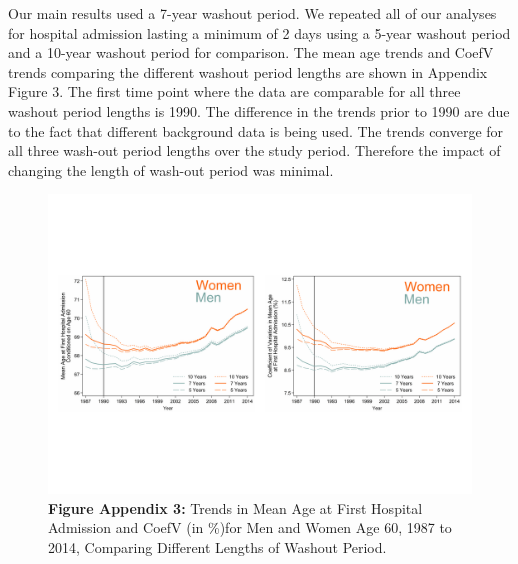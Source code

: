 \label{ch4:app3}

Our main results used a 7-year washout period. We repeated all of our analyses 
for hospital admission lasting a minimum of 2 days using a 5-year washout period 
and a 10-year washout period for comparison. The mean age trends and CoefV trends 
comparing the different washout period lengths are shown in Appendix Figure 3. The first 
time point where the data are comparable for all three washout period lengths is 
1990. The  difference in the trends prior to 1990 are due to the fact that different 
background data is being used. The trends converge for all three wash-out period 
lengths over the study period. Therefore the impact of changing the length of 
wash-out period was minimal. \\

\begin{landscape}


	\begin{figure}[H]
		\vspace{0.25in}
		\centering
		\includegraphics[scale=0.775]{Paper_3/Appendix_3.pdf}
		\caption*{\textbf{Figure Appendix 3:}	Trends in Mean Age at First Hospital 
											  	Admission and CoefV (in \%)for Men and Women Age 60, 1987 
												to 2014, Comparing Different Lengths of 
												Washout Period.}
	\end{figure}


\end{landscape}



